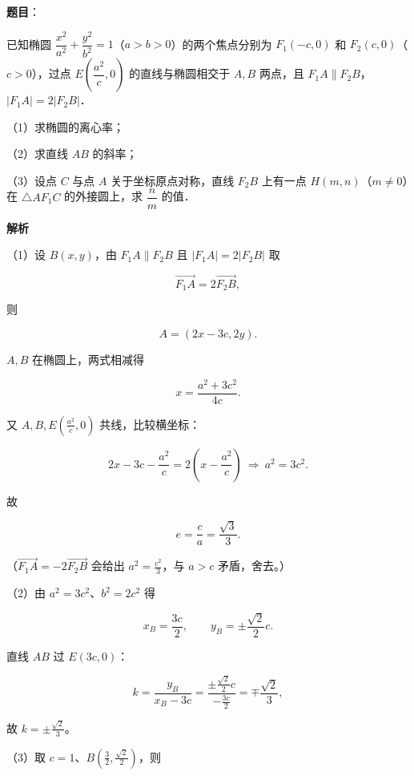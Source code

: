 \begin{answer}

\textbf{题目}：

已知椭圆 $\dfrac{x^2}{a^2}+\dfrac{y^2}{b^2}=1$（$a>b>0$）的两个焦点分别为 $F_1(-c,0)$ 和 $F_2(c,0)$（$c>0$），过点 $E\left(\dfrac{a^2}{c},0\right)$ 的直线与椭圆相交于 $A,B$ 两点，且 $F_1A\parallel F_2B$，$|F_1A|=2|F_2B|$．

（1）求椭圆的离心率；

（2）求直线 $AB$ 的斜率；

（3）设点 $C$ 与点 $A$ 关于坐标原点对称，直线 $F_2B$ 上有一点 $H(m,n)$（$m\neq0$）在 $\triangle AF_1C$ 的外接圆上，求 $\dfrac nm$ 的值．

\textbf{解析}

（1）设 $B(x,y)$，由 $F_1A\parallel F_2B$ 且 $|F_1A|=2|F_2B|$ 取

\nopagebreak[4]
\[\overrightarrow{F_1A}=2\overrightarrow{F_2B},\]

则

\nopagebreak[4]
\[A=(2x-3c,2y).\]

$A,B$ 在椭圆上，两式相减得

\nopagebreak[4]
\[x=\frac{a^2+3c^2}{4c} .\]

又 $A,B,E\left(\frac{a^2}{c},0\right)$ 共线，比较横坐标：

\nopagebreak[4]
\[2x-3c-\frac{a^2}{c}=2\left(x-\frac{a^2}{c}\right)
\ \Longrightarrow\ a^2=3c^2 .\]

故

\nopagebreak[4]
\[e=\frac ca=\frac{\sqrt3}{3} .\]

（$\overrightarrow{F_1A}=-2\overrightarrow{F_2B}$ 会给出 $a^2=\frac{c^2}{3}$，与 $a>c$ 矛盾，舍去。）

（2）由 $a^2=3c^2$、$b^2=2c^2$ 得

\nopagebreak[4]
\[x_B=\frac{3c}{2},\qquad y_B=\pm\frac{\sqrt2}{2}c .\]

直线 $AB$ 过 $E(3c,0)$：

\nopagebreak[4]
\[k=\frac{y_B}{x_B-3c}
=\frac{\pm\frac{\sqrt2}{2}c}{-\frac{3c}{2}}
=\mp\frac{\sqrt2}{3},\]

故 $k=\pm\frac{\sqrt2}{3}$。

（3）取 $c=1$、$B\left(\frac32,\frac{\sqrt2}{2}\right)$，则


\end{answer}
